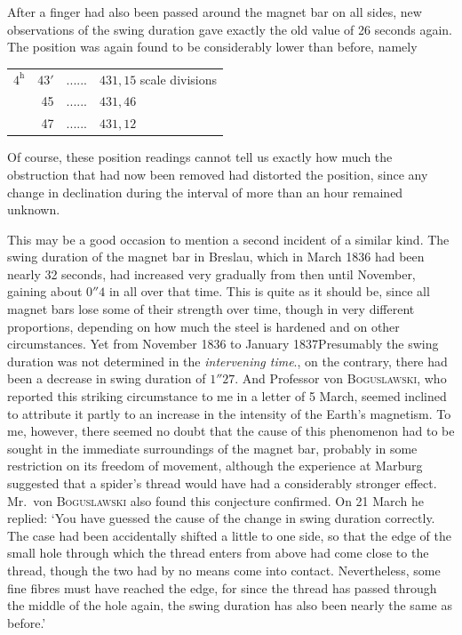 After a finger had also been passed around the magnet bar on all sides, new observations of the swing duration gave exactly the old value of 26 seconds again. The position was again found to be considerably lower than before, namely
\begin{center}
\begin{tabular}{rrc l}
$4^{\mathrm h}$&$43'$&.\quad.\quad.\quad.\quad.\quad.&$431{,}15$ scale divisions\\
&45&.\quad.\quad.\quad.\quad.\quad.&$431{,}46$\\
&47&.\quad.\quad.\quad.\quad.\quad.&$431{,}12$
\end{tabular}
\end{center}
Of course, these position readings cannot tell us exactly how much the obstruction that had now been removed had distorted the position, since any change in declination during the interval of more than an hour remained unknown.

This may be a good occasion to mention a second incident of a similar kind. The swing duration of the magnet bar in Breslau, which in March 1836 had been nearly 32 seconds, had increased very gradually from then until November, gaining about $0''4$ in all over that time. This is quite as it should be, since all magnet bars lose some of their strength over time, though in very different proportions, depending on how much the steel is hardened and on other circumstances. Yet from November 1836 to January 1837\expandafter\def\csname HistoricalNoteText577\endcsname{Presumably the swing duration was not determined in the \textit{intervening time}.}, on the contrary, there had been a
decrease in swing duration of $1''27$. And Professor von \textsc{Boguslawski}, who reported this striking circumstance to me in a letter of 5 March, seemed inclined to attribute it partly to an increase in the intensity of the Earth’s magnetism. To me, however, there seemed no doubt that the cause of this phenomenon had to be sought in the immediate surroundings of the magnet bar, probably in some restriction on its freedom of movement, although the experience at Marburg suggested that a spider’s thread would have had a considerably stronger effect. Mr.\ von \textsc{Boguslawski} also found this conjecture confirmed. On 21 March he replied: ‘You have guessed the cause of the change in swing duration correctly. The case had been accidentally shifted a little to one side, so that the edge of the small hole through which the thread enters from above had come close to the thread, though the two had by no means come into contact. Nevertheless, some fine fibres must have reached the edge, for since the thread has passed through the middle of the hole again, the swing duration has also been nearly the same as before.’

